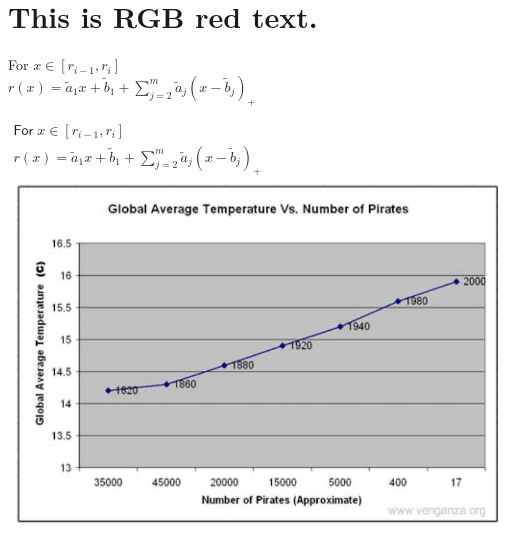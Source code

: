 \newpage
\section{{\textcolor[RGB]{255,0,0}{This is RGB red text.}}}

For $x \in[r_{i-1},r_{i}]$ \\
$r(x)={\tilde{a}}_{1}x+{\tilde{b}}_{1}+\sum_{j=2}^{m}{\tilde{a}}_{j}(x-{\tilde{b}}_{j})_{+}$

\hrulefill

$\begin{array}{l}{{\mathsf{For}\;x\in[r_{i-1},r_{i}]}}\\ {{r(x)={\tilde{a}}_{1}x+{\tilde{b}}_{1}+\sum_{j=2}^{m}{\tilde{a}}_{j}(x-{\tilde{b}}_{j})_{+}}}\end{array}$\\
\includegraphics[width=\linewidth]{test_image}

\lipsum[1]

\noindent\dotfill

\lipsum[1]